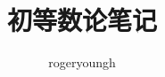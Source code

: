 \documentclass{probook}
\title{初等数论笔记}
\author{rogeryoungh}
\begin{document}
\newcommand\mfrac[2]{\dfrac{#1\smash[b]{\strut}}{#2\smash[t]{\strut}}}
\newcommand\RR{\mathbb{R}}
\newcommand\NN{\mathbb{N}}
\newcommand\ZZ{\mathbb{N}}
\newcommand\QQ{\mathbb{Q}}
\newcommand\ee{\mathrm{e}}
\newcommand\dd{\mathrm{d}}
\newcommand\uppi{\mathrm{\pi}}

\maketitle

\frontmatter

\tableofcontents

\mainmatter

\end{document}
